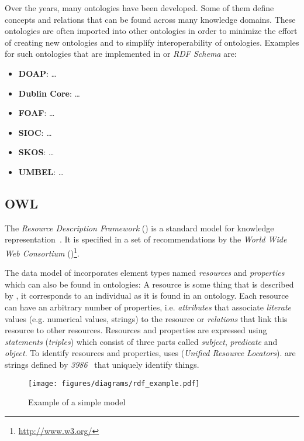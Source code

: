 Over the years, many ontologies have been developed. Some of them define concepts and relations that can be found across many knowledge domains. These ontologies are often imported into other ontologies in order to minimize the effort of creating new ontologies and to simplify interoperability of ontologies. Examples for such ontologies that are implemented in  or \emph{RDF Schema} are:
\begin{itemize} %
  \item \textbf{DOAP}: … %
  \item \textbf{Dublin Core}: … %
  \item \textbf{FOAF}: … %
  \item \textbf{SIOC}: … %
  \item \textbf{SKOS}: … %
  \item \textbf{UMBEL}: … %
\end{itemize}

\subsection{OWL}
\label{subsec:owl}

The \emph{Resource Description Framework} () is a standard model for knowledge representation~\cite{RDF}. It is specified in a set of recommendations by the \emph{World Wide Web Consortium} ()\footnote{\href{http://www.w3.org/}{http://www.w3.org/}}.

The data model of  incorporates element types named \emph{resources} and \emph{properties} which can also be found in ontologies: A resource is some thing that is described by , it corresponds to an individual as it is found in an ontology. Each resource can have an arbitrary number of properties, i.e. \emph{attributes} that associate \emph{literate} values (e.g. numerical values, strings) to the resource or \emph{relations} that link this resource to other resources. Resources and properties are expressed using \emph{statements} (\emph{triples}) which consist of three parts called \emph{subject}, \emph{predicate} and \emph{object}. To identify resources and properties,  uses  (\emph{Unified Resource Locators}).  are strings defined by \emph{ 3986}~\cite{rfc3986} that uniquely identify things.

\begin{figure}
\centering
\texttt{[image: figures/diagrams/rdf\_example.pdf]}
\caption{Example of a simple  model}
\label{fig:rdf_example}
\end{figure}

